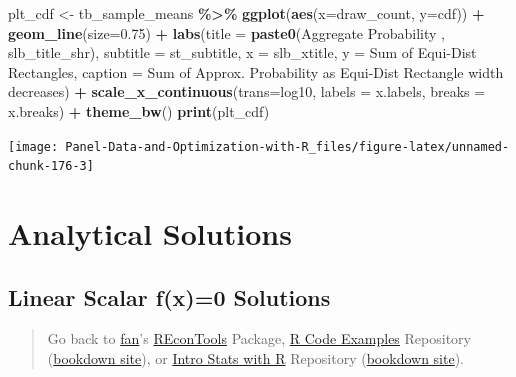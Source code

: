 \documentclass[
]{book}
\newenvironment{Shaded}{\begin{snugshade}}{\end{snugshade}}
\newcommand{\DataTypeTok}[1]{\textcolor[rgb]{0.13,0.29,0.53}{#1}}
\newcommand{\FloatTok}[1]{\textcolor[rgb]{0.00,0.00,0.81}{#1}}
\newcommand{\KeywordTok}[1]{\textcolor[rgb]{0.13,0.29,0.53}{\textbf{#1}}}
\newcommand{\NormalTok}[1]{#1}
\newcommand{\OperatorTok}[1]{\textcolor[rgb]{0.81,0.36,0.00}{\textbf{#1}}}
\newcommand{\StringTok}[1]{\textcolor[rgb]{0.31,0.60,0.02}{#1}}
\begin{document}
\begin{Shaded}
\begin{Highlighting}[]
\NormalTok{plt\_cdf \textless{}{-}}\StringTok{ }\NormalTok{tb\_sample\_means }\OperatorTok{\%\textgreater{}\%}
\StringTok{  }\KeywordTok{ggplot}\NormalTok{(}\KeywordTok{aes}\NormalTok{(}\DataTypeTok{x=}\NormalTok{draw\_count, }\DataTypeTok{y=}\NormalTok{cdf)) }\OperatorTok{+}
\StringTok{  }\KeywordTok{geom\_line}\NormalTok{(}\DataTypeTok{size=}\FloatTok{0.75}\NormalTok{) }\OperatorTok{+}
\StringTok{  }\KeywordTok{labs}\NormalTok{(}\DataTypeTok{title =} \KeywordTok{paste0}\NormalTok{(}\StringTok{\textquotesingle{}Aggregate Probability \textquotesingle{}}\NormalTok{, slb\_title\_shr),}
       \DataTypeTok{subtitle =}\NormalTok{ st\_subtitle,}
       \DataTypeTok{x =}\NormalTok{ slb\_xtitle,}
       \DataTypeTok{y =} \StringTok{\textquotesingle{}Sum of Equi{-}Dist Rectangles\textquotesingle{}}\NormalTok{,}
       \DataTypeTok{caption =} \StringTok{\textquotesingle{}Sum of Approx. Probability as Equi{-}Dist Rectangle width decreases\textquotesingle{}}\NormalTok{) }\OperatorTok{+}
\StringTok{  }\KeywordTok{scale\_x\_continuous}\NormalTok{(}\DataTypeTok{trans=}\StringTok{\textquotesingle{}log10\textquotesingle{}}\NormalTok{, }\DataTypeTok{labels =}\NormalTok{ x.labels, }\DataTypeTok{breaks =}\NormalTok{ x.breaks) }\OperatorTok{+}
\StringTok{  }\KeywordTok{theme\_bw}\NormalTok{()}
\KeywordTok{print}\NormalTok{(plt\_cdf)}
\end{Highlighting}
\end{Shaded}

\begin{center}\texttt{[image: Panel-Data-and-Optimization-with-R\_files/figure-latex/unnamed-chunk-176-3]} \end{center}

\hypertarget{analytical-solutions}{%
\section{Analytical Solutions}\label{analytical-solutions}}

\hypertarget{linear-scalar-fx0-solutions}{%
\subsection{Linear Scalar f(x)=0 Solutions}\label{linear-scalar-fx0-solutions}}

\begin{quote}
Go back to \href{http://fanwangecon.github.io/}{fan}'s \href{https://fanwangecon.github.io/REconTools/}{REconTools} Package, \href{https://fanwangecon.github.io/R4Econ/}{R Code Examples} Repository (\href{https://fanwangecon.github.io/R4Econ/bookdown}{bookdown site}), or \href{https://fanwangecon.github.io/Stat4Econ/}{Intro Stats with R} Repository (\href{https://fanwangecon.github.io/Stat4Econ/bookdown}{bookdown site}).
\end{quote}
\end{document}
